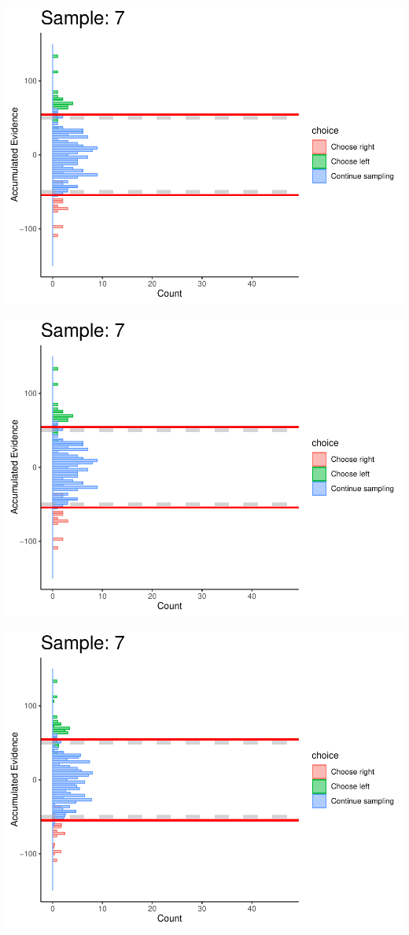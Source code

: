 \documentclass[
]{book}
\begin{document}
\begin{center}\includegraphics[width=0.8\linewidth]{LateNightBayes_files/figure-latex/fixed_dcb-64} \end{center}

\begin{center}\includegraphics[width=0.8\linewidth]{LateNightBayes_files/figure-latex/fixed_dcb-65} \end{center}

\begin{center}\includegraphics[width=0.8\linewidth]{LateNightBayes_files/figure-latex/fixed_dcb-66} \end{center}
\end{document}
